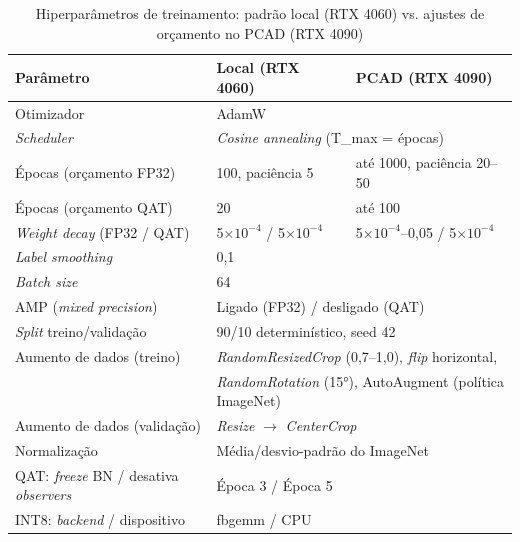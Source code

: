 \documentclass[conference]{IEEEtran}
\begin{document}
\begin{table}[!t]
\caption{Hiperparâmetros de treinamento: padrão local (RTX 4060) vs. ajustes de orçamento no PCAD (RTX 4090)}
\label{tab:hyperparams}
\centering
\begin{tabular}{@{}ll|l@{}}
\toprule
\textbf{Parâmetro} & \textbf{Local (RTX 4060)} & \textbf{PCAD (RTX 4090)} \\
\midrule
Otimizador & \multicolumn{2}{l}{AdamW \cite{loshchilov2019adamw}} \\
\textit{Scheduler} & \multicolumn{2}{l}{\textit{Cosine annealing} (T\_max = épocas)} \\
Épocas (orçamento FP32) & 100, paciência 5 & até 1000, paciência 20--50 \\
Épocas (orçamento QAT) & 20 & até 100 \\
\textit{Weight decay} (FP32 / QAT) & 5$\times10^{-4}$ / 5$\times10^{-4}$ & 5$\times10^{-4}$--0,05 / 5$\times10^{-4}$ \\
\textit{Label smoothing} & \multicolumn{2}{l}{0,1} \\
\textit{Batch size} & \multicolumn{2}{l}{64} \\
AMP (\textit{mixed precision}) & \multicolumn{2}{l}{Ligado (FP32) / desligado (QAT)} \\
\textit{Split} treino/validação & \multicolumn{2}{l}{90/10 determinístico, seed 42} \\
Aumento de dados (treino) & \multicolumn{2}{l}{\textit{RandomResizedCrop} (0,7--1,0), \textit{flip} horizontal,} \\
 & \multicolumn{2}{l}{\textit{RandomRotation} (15°), AutoAugment (política ImageNet) \cite{cubuk2019autoaugment}} \\
Aumento de dados (validação) & \multicolumn{2}{l}{\textit{Resize} $\to$ \textit{CenterCrop}} \\
Normalização & \multicolumn{2}{l}{Média/desvio-padrão do ImageNet} \\
QAT: \textit{freeze} BN / desativa \textit{observers} & \multicolumn{2}{l}{Época 3 / Época 5} \\
INT8: \textit{backend} / dispositivo & \multicolumn{2}{l}{fbgemm / CPU} \\
\bottomrule
\end{tabular}
\end{table}
\end{document}
